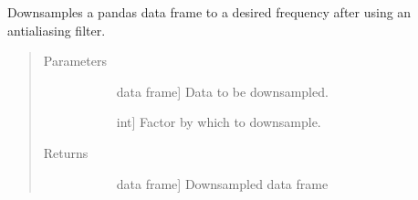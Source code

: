 \documentclass[letterpaper,10pt,english]{sphinxmanual}
\begin{document}
\begin{fulllineitems}
\label{\detokenize{index:sleeppy.utils.downsample}}
Downsamples a pandas data frame to a desired frequency after using an antialiasing filter.
\begin{quote}\begin{description}
\item[{Parameters}] \leavevmode\begin{description}
\item[{}] \leavevmode{[}data frame{]}
Data to be downsampled.

\item[{}] \leavevmode{[}int{]}
Factor by which to downsample.

\end{description}

\item[{Returns}] \leavevmode\begin{description}
\item[{}] \leavevmode{[}data frame{]}
Downsampled data frame

\end{description}

\end{description}\end{quote}

\end{fulllineitems}

\end{document}
